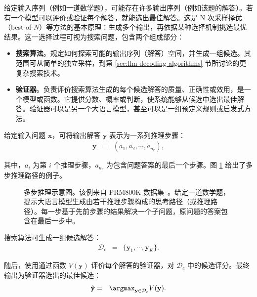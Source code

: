 给定输入序列（例如一道数学题），可能存在许多输出序列（例如该题的解答）。若有一个模型可以评价或验证每个解答，就能选出最佳解答。这是 N 次采样择优（best-of-$N$）等方法的基本原理：生成多个输出，再依据某种选择机制挑选最优结果。这一选择过程可视为搜索问题，包含两个组成部分：

\begin{itemize}
\item \vspace{0.5em} \textbf{搜索算法}。规定如何探索可能的输出序列（解答）空间，并生成一组候选。其范围可从简单的独立采样，到第 \ref{sec:llm-decoding-algorithms} 节所讨论的更复杂搜索技术。
\item \vspace{0.3em} \textbf{验证器}。负责评价搜索算法生成的每个候选解答的质量、正确性或效用，是一个模型或函数。它提供分数、概率或判断，使系统能够从候选中选出最佳解答。验证器可以是另一个大语言模型，甚至可以是一组预定义规则或启发式方法。
\end{itemize}
\vspace{0.5em}

给定输入问题 $\mathbf{x}$，可将输出解答 $\mathbf{y}$ 表示为一系列推理步骤：
\begin{eqnarray}
\mathbf{y} & = & (a_1,a_2,\cdots,a_{n_r}),
\end{eqnarray}

\noindent 其中，$a_i$ 为第 $i$ 个推理步骤，$a_{n_r}$ 为包含问题答案的最后一个步骤。图 \ref{fig:multi-step-reasoning-example} 给出了多步推理路径的例子。

\begin{figure}[!t]
\centering

\vspace{-0.5cm} \caption{多步推理示意图。该例来自 PRM800K 数据集~\cite{lightman-etal:2024lets}。给定一道数学题，提示大语言模型生成由若干推理步骤构成的思考路径（或推理路径）。每一步基于先前步骤的结果解决一个子问题，原问题的答案包含在最后一步中。}
\label{fig:multi-step-reasoning-example}
\end{figure}

搜索算法可生成一组候选解答：
\begin{eqnarray}
\mathcal{D}_c & = & \{\mathbf{y}_1,\cdots,\mathbf{y}_K\}.
\end{eqnarray}

随后，使用通过函数 $V(\mathbf{y})$ 评价每个解答的验证器，对 $\mathcal{D}_c$ 中的候选评分。最终输出为验证器选出的最佳候选：
\begin{eqnarray}
\hat{\mathbf{y}} & = & \argmax_{\mathbf{y} \in \mathcal{D}_c} V(\mathbf{y}).
\end{eqnarray}

